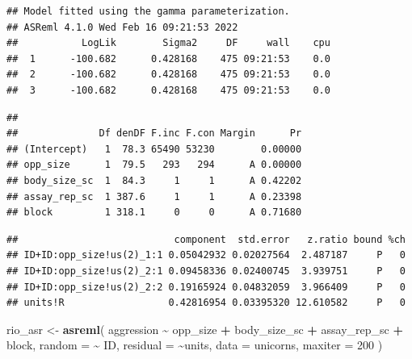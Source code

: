 \documentclass[
  12pt,
]{book}
\newenvironment{Shaded}{\begin{snugshade}}{\end{snugshade}}
\newcommand{\DataTypeTok}[1]{\textcolor[rgb]{0.13,0.29,0.53}{#1}}
\newcommand{\DecValTok}[1]{\textcolor[rgb]{0.00,0.00,0.81}{#1}}
\newcommand{\KeywordTok}[1]{\textcolor[rgb]{0.13,0.29,0.53}{\textbf{#1}}}
\newcommand{\NormalTok}[1]{#1}
\newcommand{\OperatorTok}[1]{\textcolor[rgb]{0.81,0.36,0.00}{\textbf{#1}}}
\newcommand{\StringTok}[1]{\textcolor[rgb]{0.31,0.60,0.02}{#1}}
\begin{document}
\begin{verbatim}
## Model fitted using the gamma parameterization.
## ASReml 4.1.0 Wed Feb 16 09:21:53 2022
##           LogLik        Sigma2     DF     wall    cpu
##  1      -100.682      0.428168    475 09:21:53    0.0
##  2      -100.682      0.428168    475 09:21:53    0.0
##  3      -100.682      0.428168    475 09:21:53    0.0
\end{verbatim}

\begin{verbatim}
## 
##              Df denDF F.inc F.con Margin      Pr
## (Intercept)   1  78.3 65490 53230        0.00000
## opp_size      1  79.5   293   294      A 0.00000
## body_size_sc  1  84.3     1     1      A 0.42202
## assay_rep_sc  1 387.6     1     1      A 0.23398
## block         1 318.1     0     0      A 0.71680
\end{verbatim}

\begin{Shaded}
\end{Shaded}

\begin{verbatim}
##                           component  std.error   z.ratio bound %ch
## ID+ID:opp_size!us(2)_1:1 0.05042932 0.02027564  2.487187     P   0
## ID+ID:opp_size!us(2)_2:1 0.09458336 0.02400745  3.939751     P   0
## ID+ID:opp_size!us(2)_2:2 0.19165924 0.04832059  3.966409     P   0
## units!R                  0.42816954 0.03395320 12.610582     P   0
\end{verbatim}

\begin{Shaded}
\begin{Highlighting}[]
\NormalTok{rio\_asr \textless{}{-}}\StringTok{ }\KeywordTok{asreml}\NormalTok{(}
\NormalTok{  aggression }\OperatorTok{\textasciitilde{}}\StringTok{ }\NormalTok{opp\_size }\OperatorTok{+}\StringTok{ }\NormalTok{body\_size\_sc }\OperatorTok{+}\StringTok{ }\NormalTok{assay\_rep\_sc }\OperatorTok{+}\StringTok{ }\NormalTok{block,}
  \DataTypeTok{random =} \OperatorTok{\textasciitilde{}}\StringTok{ }\NormalTok{ID,}
  \DataTypeTok{residual =} \OperatorTok{\textasciitilde{}}\NormalTok{units,}
  \DataTypeTok{data =}\NormalTok{ unicorns,}
  \DataTypeTok{maxiter =} \DecValTok{200}
\NormalTok{)}
\end{Highlighting}
\end{Shaded}
\end{document}
